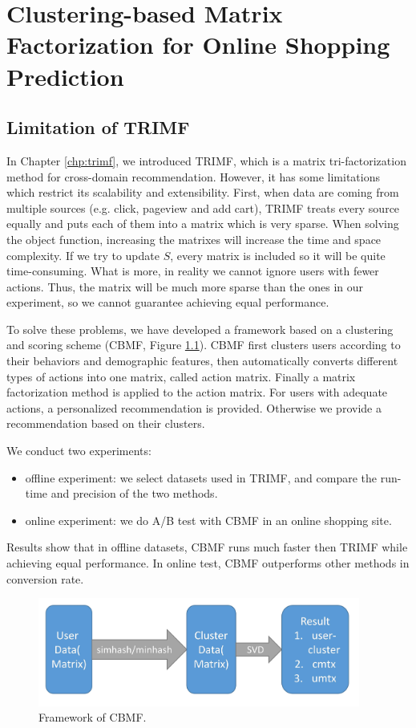 ﻿\chapter{Clustering-based Matrix Factorization for Online Shopping Prediction}
\label{chp:cbmf}
\section{Limitation of TRIMF}
In Chapter \ref{chp:trimf}, we introduced TRIMF, which is a matrix tri-factorization method for cross-domain recommendation. However, it has some limitations which restrict its scalability and extensibility. First, when data are coming from multiple sources (e.g. click, pageview and add cart), TRIMF treats every source equally and puts each of them into a matrix which is very sparse. When solving the object function, increasing the matrixes will increase the time and space complexity. If we try to update $S$, every matrix is included so it will be quite time-consuming. What is more, in reality we cannot ignore users with fewer actions. Thus, the matrix will be much more sparse than the ones in our experiment, so we cannot guarantee achieving equal performance.

To solve these problems, we have developed a framework based on a clustering and scoring scheme (CBMF, Figure \ref{fig:cbmf}). CBMF first clusters users according to their behaviors and demographic features, then automatically converts different types of actions into one matrix, called action matrix. Finally a matrix factorization method is applied to the action matrix. For users with adequate actions, a personalized recommendation is provided. Otherwise we provide a recommendation based on their clusters.

We conduct two experiments: 
\begin{itemize}
\item offline experiment: we select datasets used in TRIMF, and compare the run-time and precision of the two methods.
\item online experiment: we do A/B test with CBMF in an online shopping site.
\end{itemize}
Results show that in offline datasets, CBMF runs much faster then TRIMF while achieving equal performance. In online test, CBMF outperforms other methods in conversion rate.


\begin{figure}


\begin{center}
\includegraphics[width=400px]{fig/d} 
\caption{Framework of CBMF.}
\label{fig:cbmf}
\end{center}
\end{figure}





